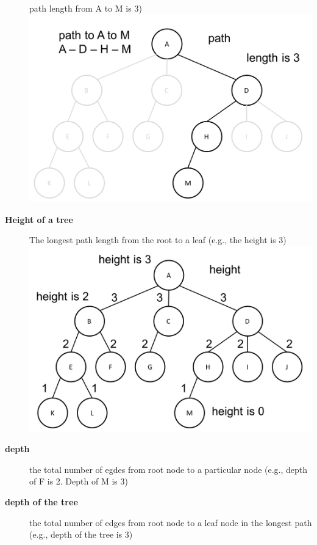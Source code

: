 \documentclass[newPxFont,sthlmFooter,nooffset]{beamer}
\begin{document}
\begin{frame}[t, allowframebreaks]
\begin{description}
    path length from A to M is 3)\\
\includegraphics[height=0.3\textheight]{./figures/fig02_def_path.png}
  \item[\textbf{Height of a tree}] The longest path length from the
    root to a leaf (e.g., the height is 3)\\
\includegraphics[height=0.3\textheight]{./figures/fig02_def_height.png}
\newpage  \item[\textbf{depth}] the total number of egdes from root node to a
    particular node (e.g., depth of F is 2. Depth of M is 3)
  \item[\textbf{depth of the tree}] the total number of edges from
    root node to a leaf node in the longest path (e.g., depth of the
    tree is 3)\\

\end{description}
\end{frame}
\end{document}
